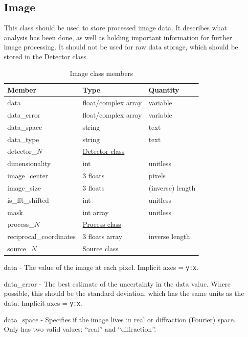\documentclass[usletter,11pt]{article}
\newcommand{\member}[2]
{ \noindent
{ \color{softBlue}  #1 - } #2
\vspace{0.2cm}
}
\begin{document}
\subsection{Image}
\label{table:image}

This class should be used to store processed image data. It describes
what analysis has been done, as well as holding important information
for further image processing. It should not be used for raw data
storage, which should be stored in the Detector class.

\begin{table}[h!]\sffamily \footnotesize
\caption{Image class members}

\begin{tabular}{p{4.5cm} p{4.5cm}  p{2.5cm} }

\toprule
\bfseries Member     & \bfseries Type & \bfseries Quantity \\
\midrule
data &  float/complex array & variable \\
data\_error & float/complex array & variable \\
data\_space & string & text \\
data\_type & string & text \\
detector\_$N$ &  \hyperref[table:detector]{Detector class} & \\
dimensionality & int & unitless \\
image\_center & 3 floats & pixels \\
image\_size & 3 floats & (inverse) length \\
is\_fft\_shifted & int & unitless \\ 
mask & int array & unitless \\
process\_$N$ &  \hyperref[table:process]{Process class} & \\
reciprocal\_coordinates & 3 floats array & inverse length  \\
source\_$N$ &  \hyperref[table:source]{Source class} & \\
\bottomrule
\end{tabular}
\end{table}

\member{data}{The value of the image at each pixel. Implicit axes = {\tt y:x}.}

\member{data\_error}{The best estimate of the uncertainty in the data
 value. Where possible, this should be the standard deviation, which
 has the same units as the data. Implicit axes = {\tt y:x}.}

\member{data\_space}{Specifies if the image lives in real or diffraction (Fourier)
 space. Only has two valid values: ``real'' and ``diffraction''. }
\end{document}
